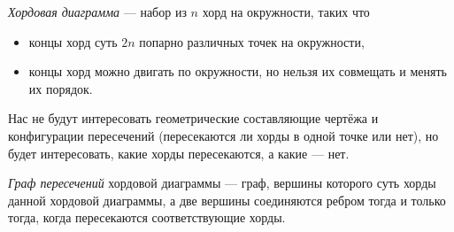 \documentclass[12pt,a4paper]{article}
\begin{document}
    \begin{definition}
        \emph{Хордовая диаграмма} --- набор из $n$ хорд на окружности, таких что
        \begin{itemize}
            \item концы хорд суть $2n$ попарно различных точек на окружности,
            \item концы хорд можно двигать по окружности, но нельзя их совмещать и менять их порядок.
        \end{itemize}
        Нас не будут интересовать геометрические составляющие чертёжа и конфигурации пересечений (пересекаются ли хорды в одной точке или нет), но будет интересовать, какие хорды пересекаются, а какие --- нет.

        \emph{Граф пересечений} хордовой диаграммы --- граф, вершины которого суть хорды данной хордовой диаграммы, а две вершины соединяются ребром тогда и только тогда, когда пересекаются соответствующие хорды.


\end{definition}
\end{document}
